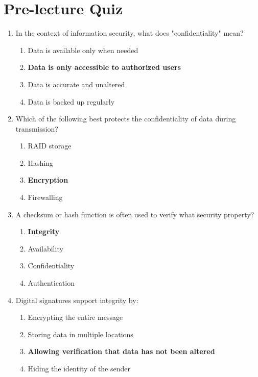 \newpage

\section{Pre-lecture Quiz}

\begin{enumerate}
    \item In the context of information security, what does "confidentiality"
          mean?
    \begin{enumerate}
        \item Data is available only when needed
        \item \textbf{Data is only accessible to authorized users}
        \item Data is accurate and unaltered
        \item Data is backed up regularly
    \end{enumerate}

    \item Which of the following best protects the confidentiality of data
          during transmission?
    \begin{enumerate}
        \item RAID storage
        \item Hashing
        \item \textbf{Encryption}
        \item Firewalling
    \end{enumerate}

    \item A checksum or hash function is often used to verify what security
          property?
    \begin{enumerate}
        \item \textbf{Integrity}
        \item Availability
        \item Confidentiality
        \item Authentication
    \end{enumerate}

    \item Digital signatures support integrity by:
    \begin{enumerate}
        \item Encrypting the entire message
        \item Storing data in multiple locations
        \item \textbf{Allowing verification that data has not been altered}
        \item Hiding the identity of the sender
    \end{enumerate}


\end{enumerate}
